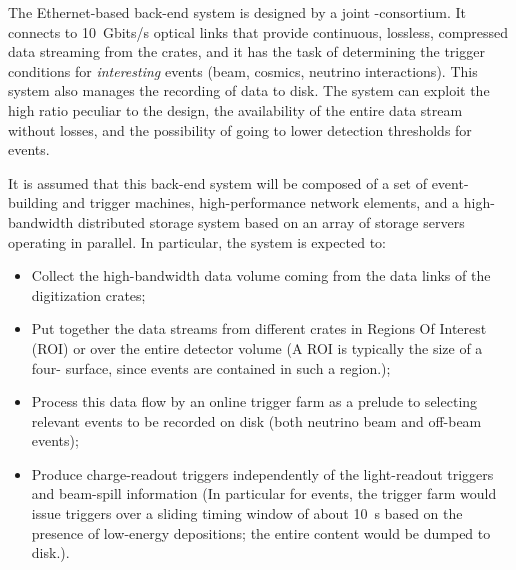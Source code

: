 The Ethernet-based  back-end system is designed by a joint \single{}-\dual consortium. It connects to %
\SI{10}{Gbits/s} optical links that provide continuous, lossless, compressed data streaming from the  crates, and it has the task of determining the trigger conditions for \textit{interesting} events (beam, cosmics,  neutrino interactions). This system also manages the recording of data to disk. %
The system can exploit the high  ratio peculiar to the \dual design, the availability of the entire data stream without losses, and the possibility of going to lower detection thresholds for  events.

 It  is assumed that this  back-end system will be composed of a set of event-building and trigger machines, high-performance network elements, and a high-bandwidth distributed storage system based on an array of storage servers operating in parallel. In particular, the  system is expected to:

\begin{itemize}
\item Collect the high-bandwidth data volume coming from the data links of the  digitization crates; 
\item Put together the data streams from different crates in Regions Of Interest (ROI) or over the entire detector volume (A ROI is typically the size of a  four- surface, since events are contained in such a region.);
\item Process this data flow by an online trigger farm %
as a prelude to selecting relevant events to be recorded on disk (both neutrino beam and off-beam events);
\item Produce charge-readout triggers independently of the light-readout triggers and beam-spill information %
(In particular for  events, the trigger farm would issue triggers over a sliding timing window of about \SI{10}{s}  based on the presence of low-energy depositions; the entire content would be dumped to disk.).
\end{itemize}

